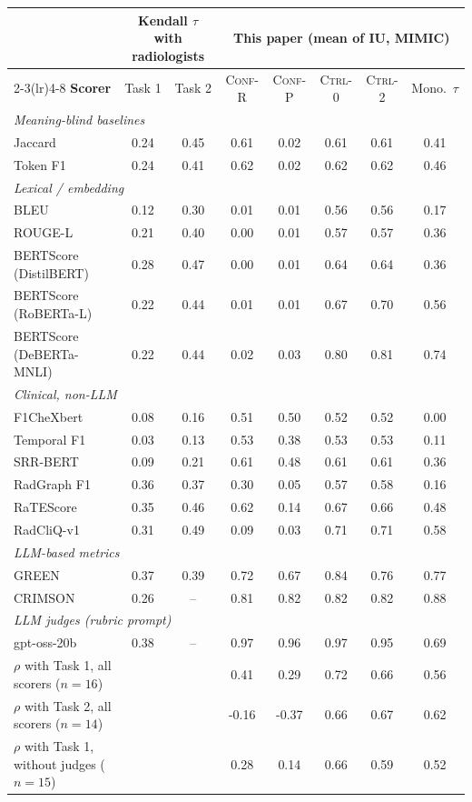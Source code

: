 \begin{tabular}{lccccccc}
\toprule
 & \multicolumn{2}{c}{\textbf{Kendall $\tau$ with radiologists}} & \multicolumn{5}{c}{\textbf{This paper (mean of IU, MIMIC)}} \\
\cmidrule(lr){2-3}\cmidrule(lr){4-8}
\textbf{Scorer} & Task 1 & Task 2 & \textsc{Conf-R} & \textsc{Conf-P} & \textsc{Ctrl-0} & \textsc{Ctrl-2} & Mono.\ $\tau$ \\
\midrule
\multicolumn{8}{l}{\textit{Meaning-blind baselines}} \\
Jaccard & 0.24 & 0.45 & 0.61 & 0.02 & 0.61 & 0.61 & 0.41 \\
Token F1 & 0.24 & 0.41 & 0.62 & 0.02 & 0.62 & 0.62 & 0.46 \\
\multicolumn{8}{l}{\textit{Lexical / embedding}} \\
BLEU & 0.12 & 0.30 & 0.01 & 0.01 & 0.56 & 0.56 & 0.17 \\
ROUGE-L & 0.21 & 0.40 & 0.00 & 0.01 & 0.57 & 0.57 & 0.36 \\
BERTScore (DistilBERT) & 0.28 & 0.47 & 0.00 & 0.01 & 0.64 & 0.64 & 0.36 \\
BERTScore (RoBERTa-L) & 0.22 & 0.44 & 0.01 & 0.01 & 0.67 & 0.70 & 0.56 \\
BERTScore (DeBERTa-MNLI) & 0.22 & 0.44 & 0.02 & 0.03 & 0.80 & 0.81 & 0.74 \\
\multicolumn{8}{l}{\textit{Clinical, non-LLM}} \\
F1CheXbert & 0.08 & 0.16 & 0.51 & 0.50 & 0.52 & 0.52 & 0.00 \\
Temporal F1 & 0.03 & 0.13 & 0.53 & 0.38 & 0.53 & 0.53 & 0.11 \\
SRR-BERT & 0.09 & 0.21 & 0.61 & 0.48 & 0.61 & 0.61 & 0.36 \\
RadGraph F1 & 0.36 & 0.37 & 0.30 & 0.05 & 0.57 & 0.58 & 0.16 \\
RaTEScore & 0.35 & 0.46 & 0.62 & 0.14 & 0.67 & 0.66 & 0.48 \\
RadCliQ-v1 & 0.31 & 0.49 & 0.09 & 0.03 & 0.71 & 0.71 & 0.58 \\
\multicolumn{8}{l}{\textit{LLM-based metrics}} \\
GREEN & 0.37 & 0.39 & 0.72 & 0.67 & 0.84 & 0.76 & 0.77 \\
CRIMSON & 0.26 & -- & 0.81 & 0.82 & 0.82 & 0.82 & 0.88 \\
\multicolumn{8}{l}{\textit{LLM judges (rubric prompt)}} \\
gpt-oss-20b & 0.38 & -- & 0.97 & 0.96 & 0.97 & 0.95 & 0.69 \\
\midrule
$\rho$ with Task 1, all scorers ($n{=}16$) & & & 0.41 & 0.29 & 0.72 & 0.66 & 0.56 \\
$\rho$ with Task 2, all scorers ($n{=}14$) & & & -0.16 & -0.37 & 0.66 & 0.67 & 0.62 \\
$\rho$ with Task 1, without judges ($n{=}15$) & & & 0.28 & 0.14 & 0.66 & 0.59 & 0.52 \\
\bottomrule
\end{tabular}